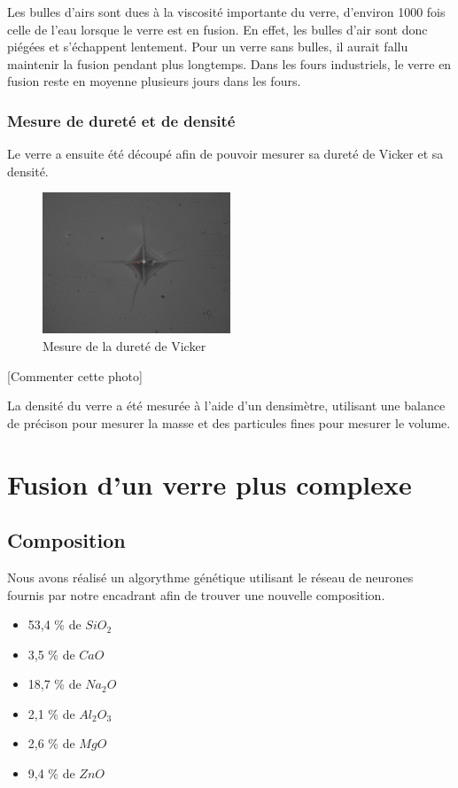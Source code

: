 \documentclass{article}
\begin{document}
Les bulles d'airs sont dues à la viscosité importante du verre, d'environ 1000 fois celle de l'eau lorsque le verre est en fusion. En effet, les bulles d'air sont donc piégées et s'échappent lentement. Pour un verre sans bulles, il aurait fallu maintenir la fusion pendant plus longtemps. Dans les fours industriels, le verre en fusion reste en moyenne plusieurs jours dans les fours.

\subsubsection{Mesure de dureté et de densité}

Le verre a ensuite été découpé afin de pouvoir mesurer sa dureté de Vicker et sa densité. 


\begin{figure}[h]
    \centering
    \includegraphics[width=0.5\textwidth]{photos/dureté.jpg}
    \caption{Mesure de la dureté de Vicker}
\end{figure}

[Commenter cette photo]


La densité du verre a été mesurée à l'aide d'un densimètre, utilisant une balance de précison pour mesurer la masse et des particules fines pour mesurer le volume. 

\section{Fusion d'un verre plus complexe}

\subsection{Composition}

Nous avons réalisé un algorythme génétique utilisant le réseau de neurones fournis par notre encadrant afin de trouver une nouvelle composition. 

\begin{itemize}
    \item 53,4 \% de $SiO_2$
    \item 3,5 \% de $CaO$
    \item 18,7 \% de $Na_2O$
    \item 2,1 \% de $Al_2O_3$
    \item 2,6 \% de $MgO$
    \item 9,4 \% de $ZnO$
\end{itemize}
\end{document}
